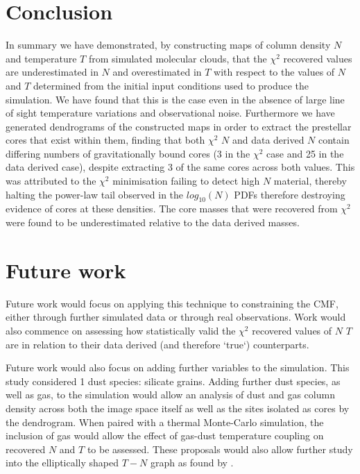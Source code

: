 \documentclass{report}
\begin{document}
\chapter{Conclusion}
In summary we have demonstrated, by constructing maps of column density $N$ and temperature $T$ from simulated molecular clouds, that the $\chi^{2}$ recovered values are underestimated in $N$ and overestimated in $T$ with respect to the values of $N$ and $T$ determined from the initial input conditions used to produce the simulation. We have found that this is the case even in the absence of large line of sight temperature variations and observational noise. Furthermore we have generated dendrograms of the constructed maps in order to extract the prestellar cores that exist within them, finding that both $\chi^{2}$ $N$ and data derived $N$ contain differing numbers of gravitationally bound cores (3 in the $\chi^{2}$ case and 25 in the data derived case), despite extracting 3 of the same cores across both values. This was attributed to the $\chi^{2}$ minimisation failing to detect high $N$ material, thereby halting the power-law tail observed in the $log_{10}(N)$ PDFs therefore destroying evidence of cores at these densities. The core masses that were recovered from $\chi^{2}$ were found to be underestimated relative to the data derived masses.


\chapter{Future work}
Future work would focus on applying this technique to constraining the CMF, either through further simulated data or through real observations. Work would also commence on assessing how statistically valid the $\chi^{2}$ recovered values of $N$ $T$ are in relation to their data derived (and therefore `true`) counterparts.

Future work would also focus on adding further variables to the simulation. This study considered 1 dust species: silicate grains. Adding further dust species, as well as gas, to the simulation would allow an analysis of dust and gas column density across both the image space itself as well as the sites isolated as cores by the dendrogram. When paired with a thermal Monte-Carlo simulation, the inclusion of gas would allow the effect of gas-dust temperature coupling on recovered $N$ and $T$ to be assessed. These proposals would also allow further study into the elliptically shaped $T-N$ graph as found by \textcite{noise,noiseb}.
\end{document}
